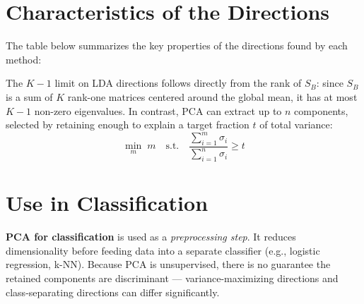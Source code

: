 \bigskip
\section*{Characteristics of the Directions}

The table below summarizes the key properties of the directions found by each method:

\begin{center}
\renewcommand{\arraystretch}{1.2}
\setlength{\tabcolsep}{4pt}
%
\end{center}

\medskip
The $K-1$ limit on LDA directions follows directly from the rank of $S_B$: since $S_B$ is a sum of $K$ rank-one matrices centered around the global mean, it has at most $K-1$ non-zero eigenvalues. In contrast, PCA can extract up to $n$ components, selected by retaining enough to explain a target fraction $t$ of total variance:
\[
\min_m \; m \quad \text{s.t.} \quad \frac{\sum_{i=1}^m \sigma_i}{\sum_{i=1}^n \sigma_i} \geq t
\]

\bigskip
\section*{Use in Classification}

\textbf{PCA for classification} is used as a \emph{preprocessing step}. It reduces dimensionality before feeding data into a separate classifier (e.g., logistic regression, k-NN). Because PCA is unsupervised, there is no guarantee the retained components are discriminant --- variance-maximizing directions and class-separating directions can differ significantly.


